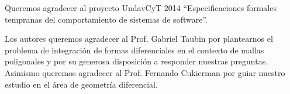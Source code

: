 \documentclass[conference,compsoc,a4paper]{IEEEtran}
\begin{document}
Queremos agradecer al proyecto UndavCyT 2014 ``Especificaciones formales 
tempranas del comportamiento de sistemas de software''.

\bigskip

Los autores queremos agradecer al Prof. Gabriel Taubin por plantearnos 
el problema de integración de formas diferenciales en el contexto de 
mallas poligonales y por su generosa disposición a responder nuestras 
preguntas. Asimismo queremos agradecer al Prof. Fernando Cukierman por 
guiar nuestro estudio en el área de geometría diferencial.




%
%
%

\renewcommand\refname{Referencias}
\end{document}

